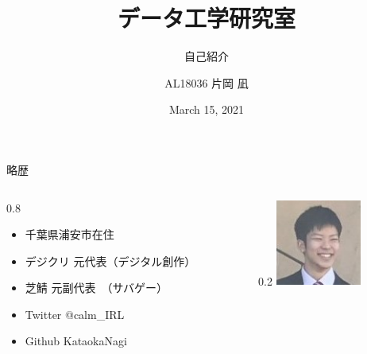\documentclass[aspectratio=169, dvipdfmx, 14pt, xcolor={svgnames,dvipsnames}]{beamer}
\title[データ工学研究室 自己紹介]{データ工学研究室}
\subtitle{自己紹介}
\author[片岡 凪]{AL18036 片岡 凪}
\institute[AL18036]{芝浦工業大学 データ工学研究室 B3}
\date{March 15, 2021}
\newlength{\mytotalwidth}
\newlength{\mycolumnwidth}
\begin{document}
\maketitle

\begin{frame}{\quad 略歴}
  \begin{columns}[totalwidth=\mytotalwidth]
    \begin{column}[t]{0.8\mycolumnwidth}
      \begin{itemize}
        \item 千葉県浦安市在住
        \item デジクリ 元代表（デジタル創作）
        \item 芝鯖 元副代表　（サバゲー）
        \item Twitter @calm\_IRL
        \item Github  KataokaNagi
      \end{itemize}
    \end{column}
    \begin{column}[T]{0.2\mycolumnwidth}
      \centering
      \includegraphics[width=80pt]{img/icon.jpg}
    \end{column}
  \end{columns}
\end{frame}
\end{document}
